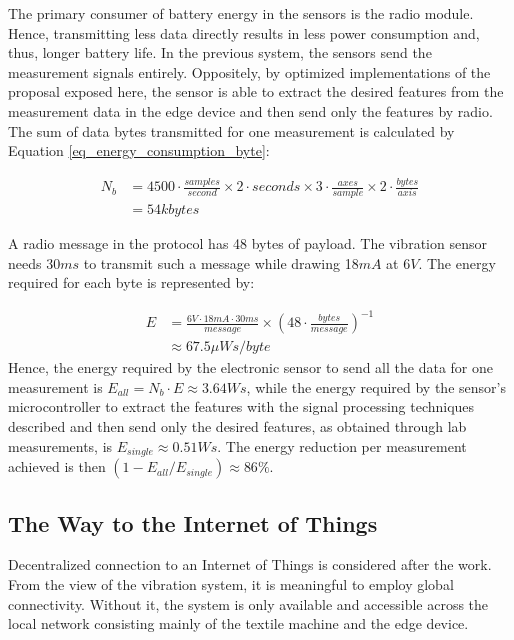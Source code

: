 \documentclass[conference]{IEEEtran}
\begin{document}
The primary consumer of battery energy in the sensors is the radio module. Hence, transmitting less data directly results in less power consumption and, thus, longer battery life. In the previous system, the sensors send the measurement signals entirely. Oppositely, by optimized implementations of the proposal exposed here, the sensor is able to extract the desired features from the measurement data in the edge device and then send only the features by radio. The sum of data bytes transmitted for one measurement is calculated by Equation \ref{eq_energy_consumption_byte}:

\begin{equation}
\begin{aligned}
	N_{b} &= 4500 \cdot  \frac{samples}{second} \times 2 \cdot seconds \times 3 \cdot \frac{axes}{sample} \times 2 \cdot \frac{bytes}{axis} \\
	  &= 54 kbytes
\end{aligned}
\label{eq_energy_consumption_byte}
\end{equation}

A radio message in the protocol has 48 bytes of payload. The vibration sensor needs 30$ms$ to transmit such a message while drawing 18$mA$ at 6$V$. The energy required for each byte is represented by: 

\begin{equation}
\begin{aligned}
	E &= \frac{6V \cdot 18mA \cdot 30ms}{message} \times \left( 48 \cdot \frac{bytes}{message} \right)^{-1} \\
	  & \approx 67.5 \mu Ws/byte
\end{aligned}
\label{eq_energy_consumption_pro_byte}
\end{equation}
Hence, the energy required by the electronic sensor to send all the data for one measurement is $E_{all} = N_{b} \cdot E \approx 3.64 Ws$, while the energy required by the sensor's microcontroller to extract the features with the signal processing techniques described and then send only the desired features, as obtained through lab measurements, is $E_{single} \approx 0.51 Ws$. The energy reduction per measurement achieved is then $(1 - E_{all}/E_{single}) \approx 86\% $.

\subsection{The Way to the Internet of Things}
Decentralized connection to an Internet of Things is considered after the work. From the view of the vibration system, it is meaningful to employ global connectivity. Without it, the system is only available and accessible across the local network consisting mainly of the textile machine and the edge device.
\end{document}
